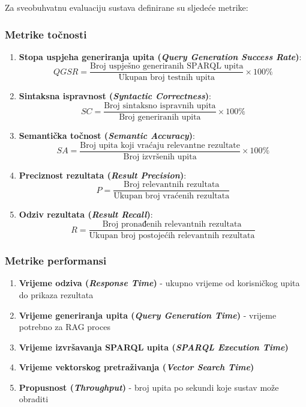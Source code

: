 Za sveobuhvatnu evaluaciju sustava definirane su sljedeće metrike:

\subsubsection{Metrike točnosti}

\begin{enumerate}
    \item \textbf{Stopa uspjeha generiranja upita (\textit{Query Generation Success Rate})}:
    $$QGSR = \frac{\text{Broj uspješno generiranih SPARQL upita}}{\text{Ukupan broj testnih upita}} \times 100\%$$
    
    \item \textbf{Sintaksna ispravnost (\textit{Syntactic Correctness})}:
    $$SC = \frac{\text{Broj sintaksno ispravnih upita}}{\text{Broj generiranih upita}} \times 100\%$$
    
    \item \textbf{Semantička točnost (\textit{Semantic Accuracy})}:
    $$SA = \frac{\text{Broj upita koji vraćaju relevantne rezultate}}{\text{Broj izvršenih upita}} \times 100\%$$
    
    \item \textbf{Preciznost rezultata (\textit{Result Precision})}:
    $$P = \frac{\text{Broj relevantnih rezultata}}{\text{Ukupan broj vraćenih rezultata}}$$
    
    \item \textbf{Odziv rezultata (\textit{Result Recall})}:
    $$R = \frac{\text{Broj pronađenih relevantnih rezultata}}{\text{Ukupan broj postojećih relevantnih rezultata}}$$
\end{enumerate}

\subsubsection{Metrike performansi}

\begin{enumerate}
    \item \textbf{Vrijeme odziva (\textit{Response Time})} - ukupno vrijeme od korisničkog upita do prikaza rezultata
    \item \textbf{Vrijeme generiranja upita (\textit{Query Generation Time})} - vrijeme potrebno za RAG proces
    \item \textbf{Vrijeme izvršavanja SPARQL upita (\textit{SPARQL Execution Time})}
    \item \textbf{Vrijeme vektorskog pretraživanja (\textit{Vector Search Time})}
    \item \textbf{Propusnost (\textit{Throughput})} - broj upita po sekundi koje sustav može obraditi
\end{enumerate}


